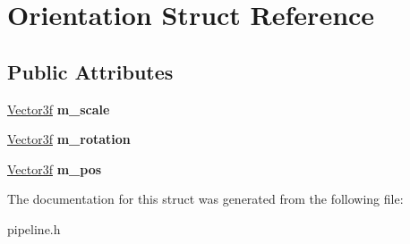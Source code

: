 \hypertarget{structOrientation}{\section{Orientation Struct Reference}
\label{structOrientation}
}
\subsection*{Public Attributes}
\begin{DoxyCompactItemize}
\item 
\hypertarget{structOrientation_aed80d57793a4f51143ea78bc3d247917}{\hyperlink{structVector3f}{Vector3f} {\bfseries m\-\_\-scale}}\label{structOrientation_aed80d57793a4f51143ea78bc3d247917}

\item 
\hypertarget{structOrientation_a9fec232d2c389810a5a992a7d799bf75}{\hyperlink{structVector3f}{Vector3f} {\bfseries m\-\_\-rotation}}\label{structOrientation_a9fec232d2c389810a5a992a7d799bf75}

\item 
\hypertarget{structOrientation_a80cbfad8ad066d273e7b64b7b6b24783}{\hyperlink{structVector3f}{Vector3f} {\bfseries m\-\_\-pos}}\label{structOrientation_a80cbfad8ad066d273e7b64b7b6b24783}

\end{DoxyCompactItemize}


The documentation for this struct was generated from the following file\-:\begin{DoxyCompactItemize}
\item 
pipeline.\-h\end{DoxyCompactItemize}
